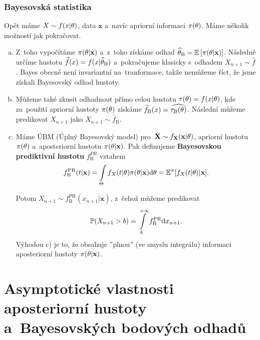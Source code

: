 	\subsection*{Bayesovská statistika}
	 Opět máme $X\sim f(x|\theta)$, data $\textbf{x}$ a~navíc apriorní informaci $\pi(\theta)$. Máme několik možností jak pokračovat.
	\begin{enumerate}[a)]
		\item  Z~toho vypočítáme $\pi(\theta|\textbf{x})$ a~z~toho získáme odhad $\widehat{\theta}_\mathrm{B}=\mathbb{E}\left[ \pi(\theta|\textbf{x}) \right]$. Následně určíme hustotu $\widehat{f}(x)=f(x|\widehat{\theta}_\mathrm{B})$ a~pokračujeme klasicky s~odhadem $X_{n+1}\sim\widehat{f}$. Bayes obecně není invariantní na~tranformace, takže nemůžeme říct, že jsme získali Bayesovský odhad hustoty.
		
		\item Můžeme také zkusit odhadnout přímo celou hustotu $\tau(\theta)=f(x|\theta)$, kde za~použití apriorní hustoty $\pi(\theta)$ získáme $\widehat{f}_\mathrm{B}(x)=\widehat{\tau_\mathrm{B}(\theta)}$. Následní můžeme predikovat $X_{n+1}$ jako $X_{n+1}\sim\widehat{f}_\mathrm{B}$.
		
		\item \begin{define} Máme ÚBM (Úplný Bayesovský model) pro~$\textbf{X}\sim f_{\textbf{X}}(\textbf{x}|\theta)$, apriorní hustotu $\pi(\theta)$ a~aposteriorní hustotu $\pi(\theta|\textbf{x})$. Pak definujeme \textbf{Bayesovskou prediktivní hustotu} $f_\mathrm{B}^{PR} $ vztahem
			$$ f_\mathrm{B}^\mathrm{PR}(t|\textbf{x})=\int\limits_{\Theta} f_X(t|\theta)\pi(\theta|\textbf{x})\mathrm{d}\theta=\mathbb{E}^\pi[f_X(t|\theta)|\textbf{x}].$$
		\end{define}
		Potom
		$ X_{n+1}\sim f_\mathrm{B}^\mathrm{PR}(x_{n+1}|\textbf{x})$, z~čehož můžeme predikovat $$\mathbb{P}(X_{n+1}>b)=\int\limits_b^{+\infty}f_\mathrm{B}^\mathrm{PR}\mathrm{d} x_{n+1}.$$
		Výhodou c) je to, že obsahuje ''plnou'' (ve smyslu integrálu) informaci aposteriorní hustoty $\pi(\theta|\textbf{x})$.
	\end{enumerate}




\chapter{Asymptotické vlastnosti aposteriorní hustoty a~Bayesovských bodových odhadů}

